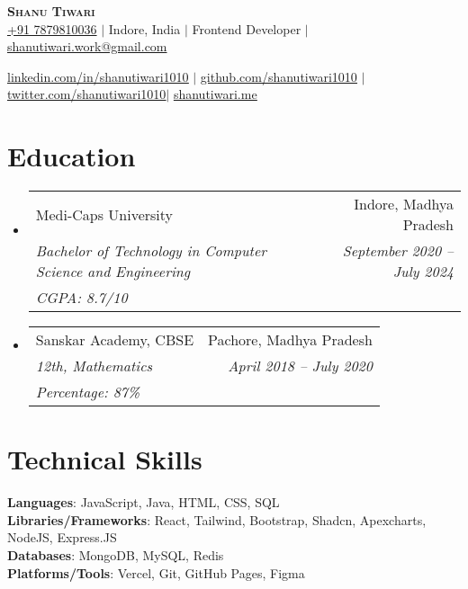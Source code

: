 \documentclass[letterpaper,11pt]{article}
\makeatletter
\newcommand{\resumeEduheading}[5]{
    \vspace{2pt}\item
      \begin{tabular*}{0.97\textwidth}[t]{l@{\extracolsep{\fill}}r}
        {#1} & #2 \\
        \textit{\small#3} & \textit{\small #4}\\
        \textit{\small#5} \\
      \end{tabular*}\vspace{-7pt}
  }
\newcommand{\resumeSubHeadingListStart}{\begin{itemize}[leftmargin=0.15in, label={}]}
\newcommand{\resumeSubHeadingListEnd}{\end{itemize}}
\makeatother
\begin{document}

\begin{center}
  \textbf{\Huge \scshape Shanu Tiwari} \\ \vspace{1pt}
  \href{tel:7879810036}{+91 7879810036} $|$
  {Indore, India} $|$
  {Frontend Developer} $|$
  \href{mailto:shanutiwari.work@gmail.com}{shanutiwari.work@gmail.com} \\ \vspace{1pt}

  \href{https://linkedin.com/in/shanutiwari1010}{\underline{linkedin.com/in/shanutiwari1010}} $|$
  \href{https://github.com/shanutiwari1010}{\underline{github.com/shanutiwari1010}} $|$
  \href{https://twitter.com/shanutiwari1010}{\underline{twitter.com/shanutiwari1010}}$|$
   \href{https://shanutiwari.me/}{\underline{shanutiwari.me}} 
  
\end{center}

\section{Education}
\resumeSubHeadingListStart
\resumeEduheading
{Medi-Caps University}{Indore, Madhya Pradesh}
{Bachelor of Technology in Computer Science and Engineering}{September 2020 -- July 2024}
{CGPA: 8.7/10}
\resumeEduheading
{Sanskar Academy, CBSE}{Pachore, Madhya Pradesh}
{12th, Mathematics}{April 2018 -- July 2020}
{Percentage: 87\%}
\resumeSubHeadingListEnd

\section{Technical Skills}
\begin{itemize}[leftmargin=0.15in, label={}]
  \small{\item{
        \textbf{Languages}{: \hfill JavaScript, Java, HTML, CSS, SQL \hfill} \\
        \vspace{3pt}\textbf{Libraries/Frameworks}{: \hfill React, Tailwind, Bootstrap, Shadcn, Apexcharts, NodeJS, Express.JS \hfill} \\
        \vspace{3pt}\textbf{Databases}{: \hfill MongoDB, MySQL, Redis \hfill} \\
        \vspace{3pt}\textbf{Platforms/Tools}{: \hfill Vercel, Git, GitHub Pages, Figma \hfill} \\
        }}
\end{itemize}
\end{document}
